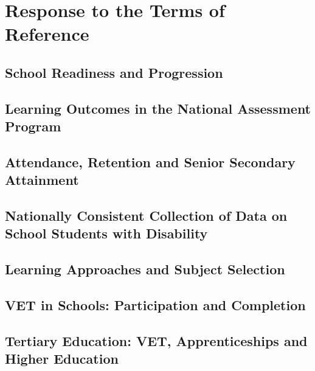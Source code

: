 \chapter{Response to the Terms of Reference}
\label{ch:tor}


\section{School Readiness and Progression}
\label{sec:tor:readiness}

\lipsum[1]

\section{Learning Outcomes in the National Assessment Program}
\label{sec:tor:outcomes}

\lipsum[2]

\section{Attendance, Retention and Senior Secondary Attainment}
\label{sec:tor:attendance}

\lipsum[3]

\section{Nationally Consistent Collection of Data on School Students with Disability}
\label{sec:tor:nccd}

\lipsum[4]

\section{Learning Approaches and Subject Selection}
\label{sec:tor:approaches}

\lipsum[1]

\section{VET in Schools: Participation and Completion}
\label{sec:tor:vet-schools}

\lipsum[2]

\section{Tertiary Education: VET, Apprenticeships and Higher Education}
\label{sec:tor:tertiary}

